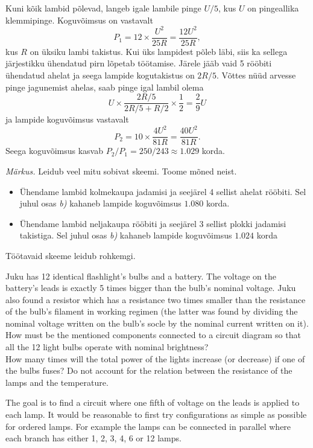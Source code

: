 {Kuni kõik lambid põlevad, langeb igale lambile pinge $U/5$, kus $U$ on pingeallika klemmipinge. Koguvõimsus on vastavalt
\[
P_1=12\times \frac{U^2}{25R}=\frac{12U^2}{25R},
\]
kus $R$ on üksiku lambi takistus. Kui üks lampidest põleb läbi, siis ka sellega järjestikku ühendatud pirn lõpetab töötamise. Järele jääb vaid 5 rööbiti ühendatud ahelat ja seega lampide kogutakistus on $2R/5$. Võttes nüüd arvesse pinge jagunemist ahelas, saab pinge igal lambil olema
\[
U\times \frac{2R/5}{2R/5+R/2} \times \frac{1}{2}=\frac{2}{9}U
\]
ja lampide koguvõimsus vastavalt
\[
P_2=10\times \frac{4U^2}{81R}=\frac{40U^2}{81R}.
\]
Seega koguvõimsus kasvab $P_2/P_1=250/243\approx \num{1.029}$ korda.

\textit{Märkus.} Leidub veel mitu sobivat skeemi. Toome mõned neist.
\begin{itemize} 
\item
Ühendame lambid kolmekaupa jadamisi ja seejärel 4 sellist ahelat rööbiti. Sel juhul osas \textit{b)} kahaneb lampide koguvõimsus $\num{1.080}$ korda.
\item
Ühendame lambid neljakaupa rööbiti ja seejärel 3 sellist plokki jadamisi takistiga. Sel juhul osas \textit{b)} kahaneb lampide koguvõimsus $\num{1.024}$ korda
\end{itemize}
Töötavaid skeeme leidub rohkemgi.
\fi


\ifEngStatement
Juku has 12 identical flashlight’s bulbs and a battery. The voltage on the battery’s leads is exactly 5 times bigger than the bulb’s nominal voltage. Juku also found a resistor which has a resistance two times smaller than the resistance of the bulb’s filament in working regimen (the latter was found by dividing the nominal voltage written on the bulb’s socle by the nominal current written on it).\\
\osa How must be the mentioned components connected to a circuit diagram so that all the 12 light bulbs operate with nominal brightness?\\
\osa How many times will the total power of the lights increase (or decrease) if one of the bulbs fuses? Do not account for the relation between the resistance of the lamps and the temperature.
\fi


\ifEngHint
The goal is to find a circuit where one fifth of voltage on the leads is applied to each lamp. It would be reasonable to first try configurations as simple as possible for ordered lamps. For example the lamps can be connected in parallel where each branch has either 1, 2, 3, 4, 6 or 12 lamps.
\fi


}
